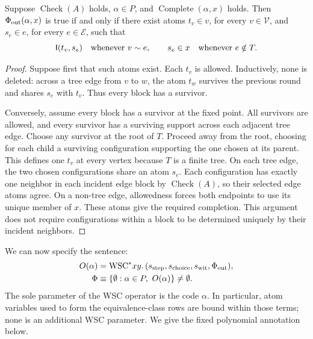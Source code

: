 \begin{lemma}\label{sen:tree-test}
Suppose \(\operatorname{Check}(A)\) holds, \(\alpha\in P\), and
\(\operatorname{Complete}(\alpha,x)\) holds. Then
\(\Phi_{\rm out}(\alpha,x)\) is true if and only if there exist atoms
\(t_v\in v\), for every \(v\in\mathcal V\), and \(s_e\in e\), for every
\(e\in\mathcal E\), such that
\[
 \mathsf I(t_v,s_e)\quad\text{whenever }v\sim e,
 \qquad s_e\in x\quad\text{whenever }e\notin T.
\]
\end{lemma}
\begin{proof}
Suppose first that such atoms exist. Each \(t_v\) is allowed. Inductively,
none is deleted: across a tree edge from \(v\) to \(w\), the atom \(t_w\)
survives the previous round and shares \(s_e\) with \(t_v\).
Thus every block has a survivor.

Conversely, assume every block has a survivor at the fixed point.
All survivors are allowed, and every survivor has a surviving support
across each adjacent tree edge. Choose any survivor at the root of
\(T\). Proceed away from the root, choosing for each child a surviving
configuration supporting the one chosen at its parent. This defines
one \(t_v\) at every vertex because \(T\) is a finite tree. On each tree
edge, the two chosen configurations share an atom \(s_e\). Each
configuration has exactly one neighbor in each incident edge block by
\(\operatorname{Check}(A)\), so their selected edge atoms agree.
On a non-tree edge, allowedness forces both endpoints to use its unique
member of \(x\). These atoms give the required completion.
This argument does not require configurations within a block to be
determined uniquely by their incident neighbors.
\end{proof}

We can now specify the sentence:
\begin{equation}
 \begin{split}
 O(\alpha)
   &=\mathrm{WSC}^*xy.\,
       (s_{\rm step},s_{\rm choice},s_{\rm wit},\Phi_{\rm out}),\\
 \Phi
   &\equiv
       \{\emptyset:\alpha\in P,\ O(\alpha)\}\ne\emptyset.
 \end{split}
 \label{sen:sentence}
\end{equation}
The sole parameter of the WSC operator is the code \(\alpha\).
In particular, atom variables used to form the equivalence-class rows
are bound within those terms; none is an additional WSC parameter.
We give the fixed polynomial annotation below.

